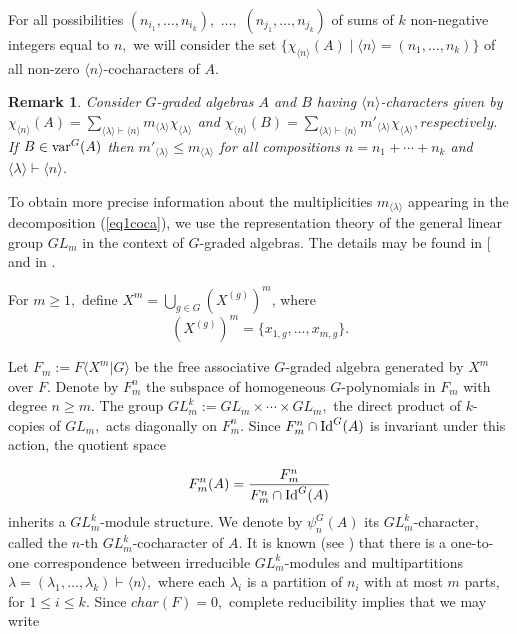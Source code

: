 \documentclass{amsart}
\newcommand{\gen}[1]{\ensuremath{\langle{#1}\rangle}}
\newcommand{\var}{\ensuremath{\textnormal{var}}}
\newcommand{\Idg}{\ensuremath{\textnormal{Id}^{G}}}
\newtheorem{observacao}[teorema]{Remark}
\numberwithin{equation}{section}
\begin{document}
For all possibilities $(n_{i_{1}},\ldots , n_{i_{k}}),$ $ \ldots ,$ $ (n_{j_{1}},\ldots , n_{j_{k}})$ of sums of $k$ non-negative integers equal to $n,$ we will consider the set $\{\chi_{\langle n \rangle  }(A)\mid \langle n\rangle =(n_1, \ldots, n_{k})  \}$ of all non-zero $\langle n \rangle $-cocharacters of $A$.




 \begin{observacao} \label{obscaracter}
Consider $G$-graded algebras $A$ and $B$ having $\gen{n}$-characters given by 
$
\chi_{\gen{n}}(A)=\displaystyle \sum_{\gen{\lambda}\vdash \gen{n}}{m}_{\gen{\lambda}}\chi_{\gen{\lambda}}$ and $ \chi_{\gen{n}}(B)=\displaystyle \sum_{\gen{\lambda}\vdash \gen{n}}{m'}_{\gen{\lambda}}\chi_{\gen{\lambda}}, respectively.
$ 
If $B \in \var^G(A)$ then ${m'}_{\gen{\lambda}} \leq {m}_{\gen{\lambda}}$ for all compositions $n=n_1+\cdots + n_k$ and $\gen{\lambda} \vdash \gen{n}$.
    \end{observacao}

	
 	
 To obtain more precise information about the multiplicities $m_{\langle \lambda \rangle}$ appearing in the decomposition  (\ref{eq1coca}), we use the representation theory of the general linear group $GL_m$ in the context of $G$-graded algebras. The
details may be found in [\cite[Section 12.4]{Dr} and in \cite{OSV}.

For $m \ge 1,$ define $X^m=
\bigcup\limits_{g\in G}(X^{(g)})^m$, where 
$$(X^{(g)})^m=\{x_{1,g}, \ldots, x_{m,g}\}.$$ 

Let $F_m:=F\langle X^m|G\rangle$ be the free associative $G$-graded algebra generated by $X^m$ over $F.$ Denote by $F_m^n$ the subspace of  homogeneous $G$-polynomials in $F_m$ with degree $n \ge m.$ The group $GL_m^{k}:= GL_m\times \cdots \times GL_m,$ the direct product of $k$-copies of $GL_m,$ acts diagonally on $F_m^n.$ Since $F_m^n\cap \Idg(A)$ is invariant under this action, the quotient space

 $$F_m^n(A)=\frac{F_m^n}{F_m^n\cap \Idg(A)}$$ 
 inherits a $GL_m^{k}$-module structure. We denote by $\psi_n^{G}(A)$ its $GL_m^{k}$-character, called the $n$-th $GL_m^{k}$-cocharacter of $A.$ It is known (see \cite{Dr})  that there is a one-to-one correspondence between irreducible $GL_m^{k}$-modules and multipartitions $\lambda=(\lambda_1, \ldots, \lambda_{k})\vdash \langle n \rangle,$ where each $\lambda_i$ is a partition of $n_i$ with at most $m$ parts, for $1 \le i \le k.$ Since $char(F)=0,$ complete reducibility implies that we may write 
 
\end{document}
